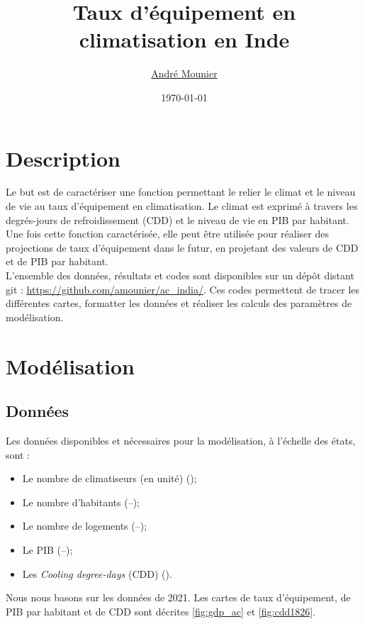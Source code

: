 \documentclass{article}
\date{\today}
\title{Taux d'équipement en climatisation en Inde}
\author{\href{mailto:andre.mounier@enpc.fr}{André Mounier}}
\begin{document}
{\huge \noindent \thetitle}

\vspace{3mm}
{\Large \noindent \theauthor}


\vspace{1cm}

\section{Description}

Le but est de caractériser une fonction permettant le relier le climat et le niveau de vie au taux d'équipement en climatisation. Le climat est exprimé à travers les degrés-jours de refroidissement (CDD) et le niveau de vie en PIB par habitant. Une fois cette fonction caractérisée, elle peut être utilisée pour réaliser des projections de taux d'équipement dans le futur, en projetant des valeurs de CDD et de PIB par habitant. \\

L'ensemble des données, résultats et codes sont disponibles sur un dépôt distant git : \url{https://github.com/amounier/ac_india/}. Ces codes permettent de tracer les différentes cartes, formatter les données et réaliser les calculs des paramètres de modélisation. 

\section{Modélisation}

\subsection{Données}

\noindent
Les données disponibles et nécessaires pour la modélisation, à l'échelle des états, sont :
\begin{itemize}
   \item Le nombre de climatiseurs (en unité) (\cite{mspi_nss_2023});
   \item Le nombre d'habitants (--);
   \item Le nombre de logements (--);
   \item Le PIB (--);
   \item Les \textit{Cooling degree-days} (CDD) (\cite{iea_weather_2023}).
\end{itemize}

Nous nous basons sur les données de 2021. Les cartes de taux d'équipement, de PIB par habitant et de CDD sont décrites \ref{fig:gdp_ac} et \ref{fig:cdd1826}.
\end{document}
